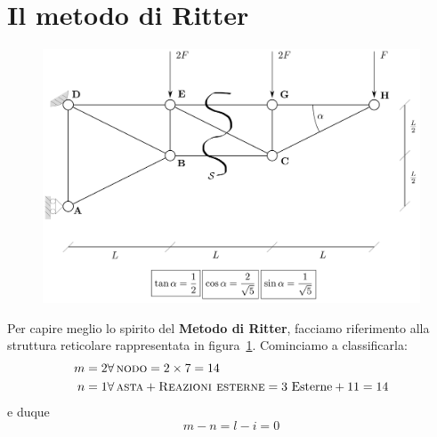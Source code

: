\section{Il metodo di Ritter}
\renewcommand{\thefigure}{9~-~1}
\begin{figure}[ht]
\centering
\includegraphics[width=\textwidth]{Immagini/Parte_9/Figura9_1/Figura9_1.pdf}
\caption{}
\label{figura9-1}
\end{figure}
Per capire meglio lo spirito del \textbf{Metodo di Ritter}, facciamo riferimento alla struttura reticolare rappresentata in figura~\ref{figura9-1}. Cominciamo a classificarla:
\begin{align*}
m &= 2\forall\,\textup{\textsc{nodo}} = 2\times 7 = 14 \\
n &= 1\forall\,\textup{\textsc{asta}}+\textup{\textsc{Reazioni esterne}} = 3\,\,\textup{Esterne} + 11 = 14
\end{align*}
e duque 
\begin{equation*}
m-n = l-i = 0
\end{equation*}
